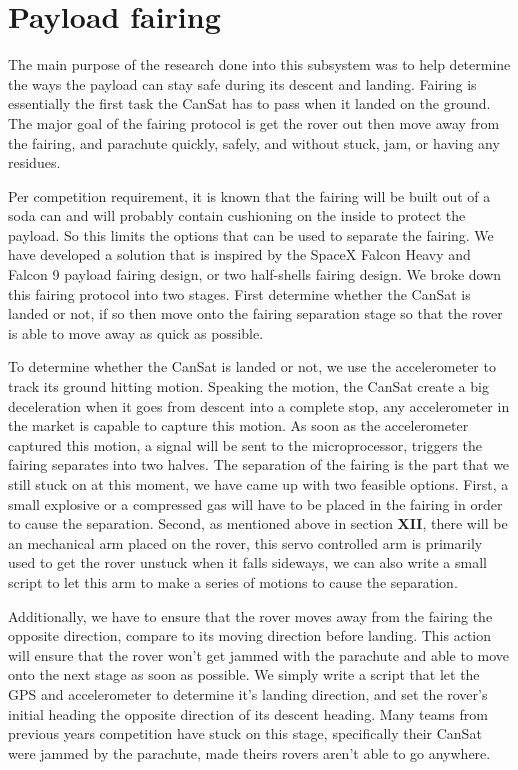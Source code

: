 \documentclass[10pt,letterpaper,onecolumn,journal]{IEEEtran}
\begin{document}
\section{Payload fairing}
The main purpose of the research done into this subsystem was to help determine the ways the payload can stay safe during its descent and landing. Fairing is essentially the first task the CanSat has to pass when it landed on the ground. The major goal of the fairing protocol is get the rover out then move away from the fairing, and parachute quickly, safely, and without stuck, jam, or having any residues. \vspace{.3cm}
\par  
Per competition requirement, it is known that the fairing will be built out of a soda can and will probably contain cushioning on the inside to protect the payload. So this limits the options that can be used to separate the fairing. We have developed a solution that is inspired by the SpaceX Falcon Heavy and Falcon 9 payload fairing design, or two half-shells fairing design.\cite{SpaceX} We broke down this fairing protocol into two stages. First determine whether the CanSat is landed or not, if so then move onto the fairing separation stage so that the rover is able to move away as quick as possible. \vspace{.3cm}
\par  
To determine whether the CanSat is landed or not, we use the accelerometer to track its ground hitting motion. Speaking the motion, the CanSat create a big deceleration when it goes from descent into a complete stop, any accelerometer in the market is capable to capture this motion. As soon as the accelerometer captured this motion, a signal will be sent to the microprocessor, triggers the fairing separates into two halves. The separation of the fairing is the part that we still stuck on at this moment, we have came up with two feasible options. First, a small explosive or a compressed gas will have to be placed in the fairing in order to cause the separation. Second, as mentioned above in section \textbf{XII}, there will be an mechanical arm placed on the rover, this servo controlled arm is primarily used to get the rover unstuck when it falls sideways, we can also write a small script to let this arm to make a series of motions to cause the separation.\vspace{.3cm}
\par  
Additionally, we have to ensure that the rover moves away from the fairing the opposite direction, compare to its moving direction before landing. This action will ensure that the rover won't get jammed with the parachute and able to move onto the next stage as soon as possible. We simply write a script that let the GPS and accelerometer to determine it's landing direction, and set the rover's initial heading the opposite direction of its descent heading. Many teams from previous years competition have stuck on this stage, specifically their CanSat were jammed by the parachute, made theirs rovers aren't able to go anywhere.\vspace{.3cm}
\end{document}
